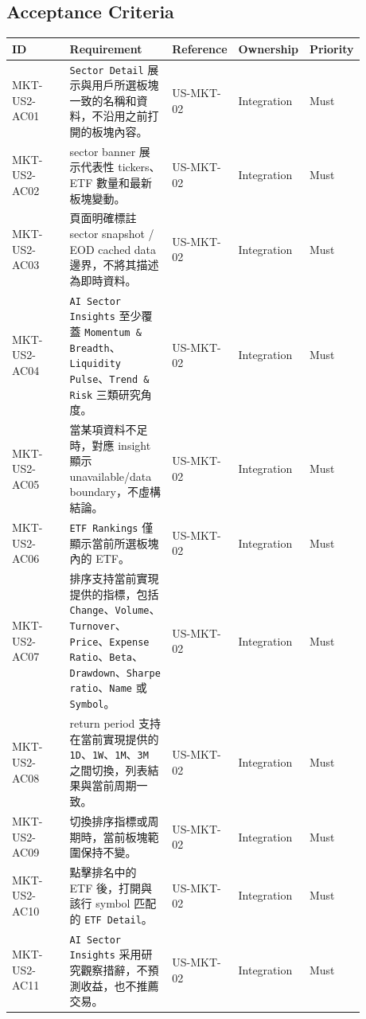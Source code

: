 \subsection{Acceptance Criteria}
\begingroup
\small
\begin{longtable}{L{0.18\linewidth}L{0.30\linewidth}L{0.18\linewidth}L{0.12\linewidth}L{0.10\linewidth}}
\toprule
\textbf{ID} & \textbf{Requirement} & \textbf{Reference} & \textbf{Ownership} & \textbf{Priority} \\
\midrule
MKT-US2-AC01 & \texttt{Sector Detail} 展示與用戶所選板塊一致的名稱和資料，不沿用之前打開的板塊內容。 & US-MKT-02 & Integration & Must \\
MKT-US2-AC02 & sector banner 展示代表性 tickers、ETF 數量和最新板塊變動。 & US-MKT-02 & Integration & Must \\
MKT-US2-AC03 & 頁面明確標註 sector snapshot /\allowbreak{} EOD cached data 邊界，不將其描述為即時資料。 & US-MKT-02 & Integration & Must \\
MKT-US2-AC04 & \texttt{AI Sector Insights} 至少覆蓋 \texttt{Momentum \& Breadth}、\texttt{Liquidity Pulse}、\texttt{Trend \& Risk} 三類研究角度。 & US-MKT-02 & Integration & Must \\
MKT-US2-AC05 & 當某項資料不足時，對應 insight 顯示 unavailable/\allowbreak{}data boundary，不虛構結論。 & US-MKT-02 & Integration & Must \\
MKT-US2-AC06 & \texttt{ETF Rankings} 僅顯示當前所選板塊內的 ETF。 & US-MKT-02 & Integration & Must \\
MKT-US2-AC07 & 排序支持當前實現提供的指標，包括 \texttt{Change}、\texttt{Volume}、\texttt{Turnover}、\texttt{Price}、\texttt{Expense Ratio}、\texttt{Beta}、\texttt{Drawdown}、\texttt{Sharpe ratio}、\texttt{Name} 或 \texttt{Symbol}。 & US-MKT-02 & Integration & Must \\
MKT-US2-AC08 & return period 支持在當前實現提供的 \texttt{1D}、\texttt{1W}、\texttt{1M}、\texttt{3M} 之間切換，列表結果與當前周期一致。 & US-MKT-02 & Integration & Must \\
MKT-US2-AC09 & 切換排序指標或周期時，當前板塊範圍保持不變。 & US-MKT-02 & Integration & Must \\
MKT-US2-AC10 & 點擊排名中的 ETF 後，打開與該行 symbol 匹配的 \texttt{ETF Detail}。 & US-MKT-02 & Integration & Must \\
MKT-US2-AC11 & \texttt{AI Sector Insights} 采用研究觀察措辭，不預測收益，也不推薦交易。 & US-MKT-02 & Integration & Must \\
\bottomrule
\end{longtable}
\endgroup
\prdhr
\hypertarget{us-mkt-03}{}
